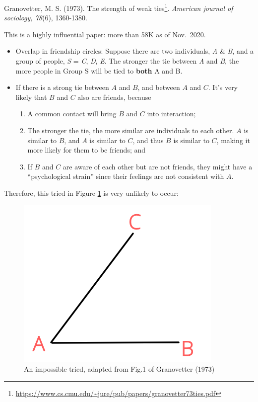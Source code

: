 \documentclass[
]{krantz}
\providecommand{\tightlist}{%
  \setlength{\itemsep}{0pt}\setlength{\parskip}{0pt}}
\renewcommand{\href}[2]{#2\footnote{\url{#1}}}
\begin{document}
Granovetter, M. S. (1973). \href{https://www.cs.cmu.edu/~jure/pub/papers/granovetter73ties.pdf}{The strength of weak ties}. \emph{American journal of sociology, 78}(6), 1360-1380.

This is a highly influential paper: more than 58K as of Nov.~2020.

\begin{itemize}
\item
  Overlap in friendship circles: Suppose there are two individuals, \emph{A} \& \emph{B}, and a group of people, \emph{S} = \emph{C}, \emph{D}, \emph{E}. The stronger the tie between \emph{A} and \emph{B}, the more people in Group S will be tied to \textbf{both} A and B.
\item
  If there is a strong tie between \(A\) and \(B\), and between \(A\) and \(C\). It's very likely that \(B\) and \(C\) also are friends, because

  \begin{enumerate}
  \def\labelenumi{\arabic{enumi}.}
  \tightlist
  \item
    A common contact will bring \(B\) and \(C\) into interaction;
  \item
    The stronger the tie, the more similar are individuals to each other. \(A\) is similar to \(B\), and \(A\) is similar to \(C\), and thus \(B\) is similar to \(C\), making it more likely for them to be friends; and
  \item
    If \(B\) and \(C\) are aware of each other but are not friends, they might have a ``psychological strain'' since their feelings are not consistent with \(A\).
  \end{enumerate}
\end{itemize}

Therefore, this tried in Figure \ref{fig:tried} is very unlikely to occur:

\begin{figure}

{\centering \includegraphics[width=0.45\linewidth]{images/tried} 

}

\caption{An impossible tried, adapted from Fig.1 of Granovetter (1973)}\label{fig:tried}
\end{figure}
\end{document}
